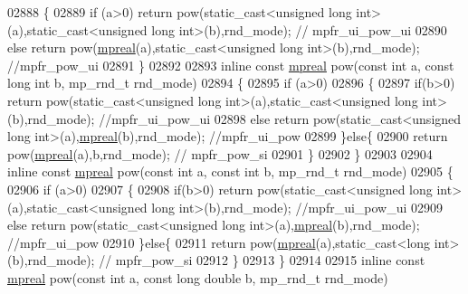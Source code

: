 \begin{DoxyCode}
{{02888 \{
02889     \textcolor{keywordflow}{if} (a>0) \textcolor{keywordflow}{return} pow(static\_cast<unsigned long int>(a),static\_cast<unsigned long int>(b),rnd\_mode);  \textcolor{comment}{//
      mpfr\_ui\_pow\_ui}
02890     \textcolor{keywordflow}{else}     \textcolor{keywordflow}{return} pow(\hyperlink{classmpfr_1_1mpreal}{mpreal}(a),static\_cast<unsigned long int>(b),rnd\_mode); \textcolor{comment}{//mpfr\_pow\_ui}
02891 \}
02892 
02893 \textcolor{keyword}{inline} \textcolor{keyword}{const} \hyperlink{classmpfr_1_1mpreal}{mpreal} pow(\textcolor{keyword}{const} \textcolor{keywordtype}{int} a, \textcolor{keyword}{const} \textcolor{keywordtype}{long} \textcolor{keywordtype}{int} b, mp\_rnd\_t rnd\_mode)
02894 \{
02895     \textcolor{keywordflow}{if} (a>0)
02896     \{
02897         \textcolor{keywordflow}{if}(b>0) \textcolor{keywordflow}{return} pow(static\_cast<unsigned long int>(a),static\_cast<unsigned long int>(b),rnd\_mode); \textcolor{comment}{
      //mpfr\_ui\_pow\_ui}
02898         \textcolor{keywordflow}{else}    \textcolor{keywordflow}{return} pow(static\_cast<unsigned long int>(a),\hyperlink{classmpfr_1_1mpreal}{mpreal}(b),rnd\_mode); \textcolor{comment}{//mpfr\_ui\_pow}
02899     \}\textcolor{keywordflow}{else}\{
02900         \textcolor{keywordflow}{return} pow(\hyperlink{classmpfr_1_1mpreal}{mpreal}(a),b,rnd\_mode); \textcolor{comment}{// mpfr\_pow\_si}
02901     \}
02902 \}
02903 
02904 \textcolor{keyword}{inline} \textcolor{keyword}{const} \hyperlink{classmpfr_1_1mpreal}{mpreal} pow(\textcolor{keyword}{const} \textcolor{keywordtype}{int} a, \textcolor{keyword}{const} \textcolor{keywordtype}{int} b, mp\_rnd\_t rnd\_mode)
02905 \{
02906     \textcolor{keywordflow}{if} (a>0)
02907     \{
02908         \textcolor{keywordflow}{if}(b>0) \textcolor{keywordflow}{return} pow(static\_cast<unsigned long int>(a),static\_cast<unsigned long int>(b),rnd\_mode); \textcolor{comment}{
      //mpfr\_ui\_pow\_ui}
02909         \textcolor{keywordflow}{else}    \textcolor{keywordflow}{return} pow(static\_cast<unsigned long int>(a),\hyperlink{classmpfr_1_1mpreal}{mpreal}(b),rnd\_mode); \textcolor{comment}{//mpfr\_ui\_pow}
02910     \}\textcolor{keywordflow}{else}\{
02911         \textcolor{keywordflow}{return} pow(\hyperlink{classmpfr_1_1mpreal}{mpreal}(a),static\_cast<long int>(b),rnd\_mode); \textcolor{comment}{// mpfr\_pow\_si}
02912     \}
02913 \}
02914 
02915 \textcolor{keyword}{inline} \textcolor{keyword}{const} \hyperlink{classmpfr_1_1mpreal}{mpreal} pow(\textcolor{keyword}{const} \textcolor{keywordtype}{int} a, \textcolor{keyword}{const} \textcolor{keywordtype}{long} \textcolor{keywordtype}{double} b, mp\_rnd\_t rnd\_mode)
}}
\end{DoxyCode}
